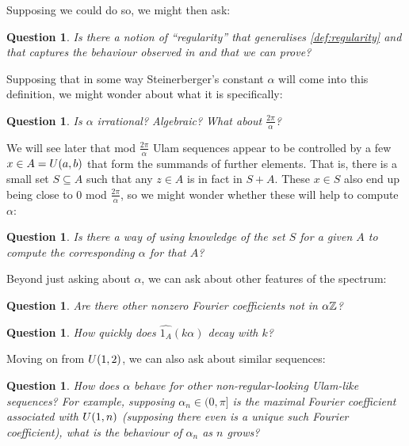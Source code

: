 \documentclass{report}
\newtheorem{question}[theorem]{Question}
\theoremstyle{remark}
\numberwithin{equation}{section}
\begin{document}
Supposing we could do so, we might then ask:

\begin{question}\label{qn:regularity_def}
  Is there a notion of ``regularity'' that generalises
  \ref{def:regularity} and that captures the behaviour observed in
  \cite{steinerberger:preprint} and that we can prove?
\end{question}

Supposing that in some way Steinerberger's constant $\alpha$ will come
into this definition, we might wonder about what it is specifically:

\begin{question}\label{qn:rationality}
  Is $\alpha$ irrational?  Algebraic?  What about
  $\frac{2\pi}{\alpha}$?  
\end{question}

We will see later that mod $\frac{2\pi}{\alpha}$ Ulam sequences appear
to be controlled by a few $x \in A =U(a,b)$ that form the
summands of further elements.  That is, there is a small set
$S \subseteq A$ such that any $z \in A$ is in fact in $S+A$.  These $x
\in S$ also end up being close to 0 mod $\frac{2\pi}{\alpha}$, so we
might wonder whether these will help to compute $\alpha$: 

\begin{question}\label{qn:compute_alpha}
  Is there a way of using knowledge of the set $S$ for a given $A$ to
  compute the corresponding $\alpha$ for that $A$?
\end{question}

Beyond just asking about $\alpha$, we can ask about other features of
the spectrum: 

\begin{question}\label{qn:spectrum}
  Are there other nonzero Fourier coefficients not in $\alpha\mathbb{Z}$?
\end{question}

\begin{question}\label{qn:decay}
  How quickly does $\widehat{1_A}(k\alpha)$ decay with $k$?
\end{question}

Moving on from $U(1,2)$, we can also ask about similar sequences: 

\begin{question}\label{qn:other_alpha}
  How does $\alpha$ behave for other non-regular-looking Ulam-like
  sequences?  For example, supposing $\alpha_n \in (0,\pi]$ is the
  maximal Fourier coefficient associated with $U(1,n)$ (supposing
  there even is a unique such Fourier coefficient), what is the
  behaviour of $\alpha_n$ as $n$ grows?
\end{question}
\end{document}

